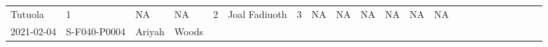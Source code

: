 \documentclass[
]{article}
\begin{document}
\begin{longtable}[]{@{}llllllllllllllllllllll@{}}
\begin{minipage}[t]{0.02\columnwidth}
Tutuola\strut
\end{minipage} & \begin{minipage}[t]{0.01\columnwidth}\raggedright
1\strut
\end{minipage} & \begin{minipage}[t]{0.03\columnwidth}\raggedright
NA\strut
\end{minipage} & \begin{minipage}[t]{0.03\columnwidth}\raggedright
NA\strut
\end{minipage} & \begin{minipage}[t]{0.02\columnwidth}\raggedright
2\strut
\end{minipage} & \begin{minipage}[t]{0.03\columnwidth}\raggedright
Joal Fadiuoth\strut
\end{minipage} & \begin{minipage}[t]{0.02\columnwidth}\raggedright
3\strut
\end{minipage} & \begin{minipage}[t]{0.01\columnwidth}\raggedright
NA\strut
\end{minipage} & \begin{minipage}[t]{0.02\columnwidth}\raggedright
NA\strut
\end{minipage} & \begin{minipage}[t]{0.03\columnwidth}\raggedright
NA\strut
\end{minipage} & \begin{minipage}[t]{0.02\columnwidth}\raggedright
NA\strut
\end{minipage} & \begin{minipage}[t]{0.02\columnwidth}\raggedright
NA\strut
\end{minipage} & \begin{minipage}[t]{0.03\columnwidth}\raggedright
NA\strut
\end{minipage}\tabularnewline
\begin{minipage}[t]{0.02\columnwidth}\raggedright
2021-02-04\strut
\end{minipage} & \begin{minipage}[t]{0.02\columnwidth}\raggedright
S-F040-P0004\strut
\end{minipage} & \begin{minipage}[t]{0.02\columnwidth}\raggedright
Ariyah\strut
\end{minipage} & \begin{minipage}[t]{0.02\columnwidth}\raggedright
Woods\strut
\end{minipage} & \begin{minipage}[t]{0.01\columnwidth}\raggedright

\end{minipage}
\end{longtable}
\end{document}
